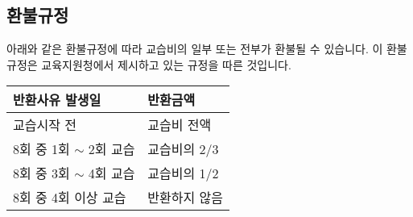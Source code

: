 \documentclass{oblivoir}
\begin{document}
\subsection{환불규정}
아래와 같은 환불규정에 따라 교습비의 일부 또는 전부가 환불될 수 있습니다.
이 환불규정은 교육지원청에서 제시하고 있는 규정을 따른 것입니다.
\begin{center}
\small
\begin{tabu}to.8\textwidth{|X[c]|X[c]|}
\hline
반환사유 발생일			&반환금액\\\hline
교습시작 전				&교습비 전액\\
8회 중 1회 \(\sim\) 2회 교습	&교습비의 2/3\\
8회 중 3회 \(\sim\) 4회 교습	&교습비의 1/2\\
8회 중 4회 이상 교습		&반환하지 않음\\\hline
\end{tabu}
\normalsize
\end{center}


\end{document}
